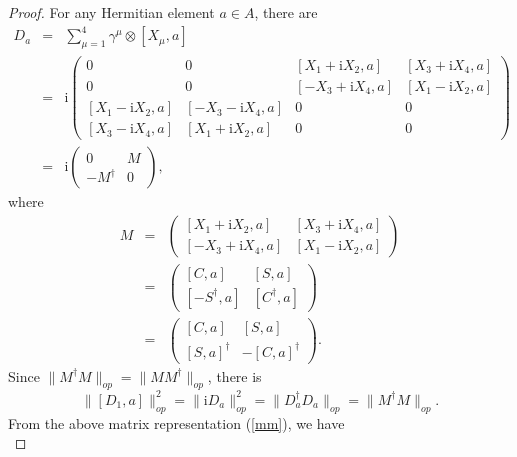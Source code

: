 \documentclass[10pt,a4paper]{amsart}
\begin{document}
\begin{proof}
  For any Hermitian element $a \in A$, there are
  \begin{eqnarray}\label{mm1}
    D_a & = & \sum_{\mu = 1}^4 \gamma^{\mu} \otimes [X_{\mu}, a] \nonumber\\
    & = & \mathrm{i} \left( \begin{array}{cccc}
      0 & 0 & [X_1 + \mathrm{i}X_2, a] & [X_3 + \mathrm{i}X_4, a]\\
      0 & 0 & [- X_3 + \mathrm{i}X_4, a] & [X_1 - \mathrm{i}X_2, a]\\
      {}[X_1 - \mathrm{i}X_2, a] & [- X_3 - \mathrm{i}X_4, a] & 0 & 0\\
      {}[X_3 - \mathrm{i}X_4, a] & [X_1 + \mathrm{i}X_2, a] & 0 & 0
    \end{array} \right) \nonumber\\
    & = & \mathrm{i} \left( \begin{array}{cc}
      0 & M\\
      - M^{\dag} & 0
    \end{array} \right), 
  \end{eqnarray}
  where
  \begin{eqnarray}\label{mm}
    M & = & \left( \begin{array}{cc}
      {}[X_1 + \mathrm{i}X_2, a] & [X_3 + \mathrm{i}X_4, a]\\
      {}[- X_3 + \mathrm{i}X_4, a] & [X_1 - \mathrm{i}X_2, a]
    \end{array} \right) \nonumber\\
    & = & \left( \begin{array}{cc}
      {}[C, a] & [S, a]\\
      {}[- S^{\dag}, a] & [C^{\dag}, a]
    \end{array} \right) \nonumber\\
    & = & \left( \begin{array}{cc}
      {}[C, a] & [S, a]\\
      {}[S, a]^{\dag} & - [C, a]^{\dag}
    \end{array} \right) . 
  \end{eqnarray}
  Since $\|M^{\dag} M\|_{op} = \|MM^{\dag} \|_{op}$, there is
  \begin{equation}\label{dam}
    \|[D_1, a]\|_{op}^2 =   \|\mathrm{i}D_a \|_{op}^2 =  
    \|D_a^{\dag} D_a \|_{op} = \|M^{\dag} M\|_{op} .
  \end{equation}
  From the above matrix representation (\ref{mm}), we have
  \begin{equation}

\end{equation}
\end{proof}
\end{document}
